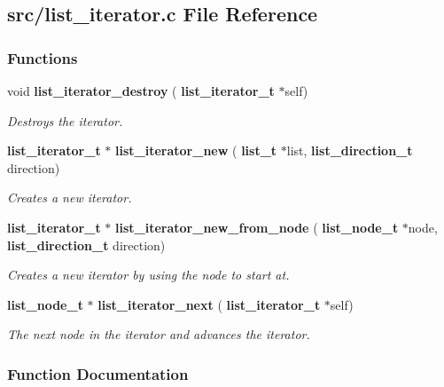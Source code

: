 \subsection{src/list\+\_\+iterator.c File Reference}
\label{list__iterator_8c}
\subsubsection*{Functions}
\begin{DoxyCompactItemize}
\item 
void \textbf{ list\+\_\+iterator\+\_\+destroy} (\textbf{ list\+\_\+iterator\+\_\+t} $\ast$self)
\begin{DoxyCompactList}\small\item\em Destroys the iterator. \end{DoxyCompactList}\item 
\textbf{ list\+\_\+iterator\+\_\+t} $\ast$ \textbf{ list\+\_\+iterator\+\_\+new} (\textbf{ list\+\_\+t} $\ast$list, \textbf{ list\+\_\+direction\+\_\+t} direction)
\begin{DoxyCompactList}\small\item\em Creates a new iterator. \end{DoxyCompactList}\item 
\textbf{ list\+\_\+iterator\+\_\+t} $\ast$ \textbf{ list\+\_\+iterator\+\_\+new\+\_\+from\+\_\+node} (\textbf{ list\+\_\+node\+\_\+t} $\ast$node, \textbf{ list\+\_\+direction\+\_\+t} direction)
\begin{DoxyCompactList}\small\item\em Creates a new iterator by using the node to start at. \end{DoxyCompactList}\item 
\textbf{ list\+\_\+node\+\_\+t} $\ast$ \textbf{ list\+\_\+iterator\+\_\+next} (\textbf{ list\+\_\+iterator\+\_\+t} $\ast$self)
\begin{DoxyCompactList}\small\item\em The next node in the iterator and advances the iterator. \end{DoxyCompactList}\end{DoxyCompactItemize}


\subsubsection{Function Documentation}
\mbox{\label{list__iterator_8c_ad16fa29ddbb444070ea65f871e1c0ba2}} 

